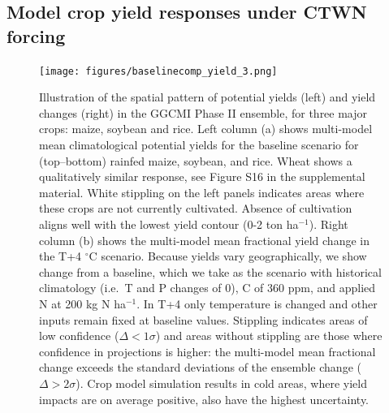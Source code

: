 \documentclass[gmd, manuscript]{copernicus} %
\begin{document}
\subsection{Model crop yield responses under CTWN forcing}
\begin{figure}[ht]
\centering
   \texttt{[image: figures/baselinecomp\_yield\_3.png]} 
  \caption{Illustration of the spatial pattern of potential yields (left) and yield changes (right) in the GGCMI Phase II ensemble, for three major crops: maize, soybean and rice. Left column (a) shows multi-model mean climatological potential yields for the baseline scenario for (top--bottom) rainfed maize, soybean, and rice. 
   Wheat shows a qualitatively similar response, see Figure S16 in the supplemental material. %
   White stippling on the left panels indicates areas where these crops are not currently cultivated. 
   Absence of cultivation aligns well with the lowest yield contour (0-2 ton ha$^{-1}$). 
   Right column (b) shows the multi-model mean fractional yield change in the T+4 $^{\circ}$C scenario.
   Because yields vary geographically, we show change from a baseline, which we take as the scenario with historical climatology (i.e.\ T and P changes of 0), C of 360 ppm, and applied N at 200 kg N ha$^{-1}$. 
   In T+4 only temperature is changed and other inputs remain fixed at baseline values. 
   Stippling indicates areas of low confidence ($\Delta < 1 \sigma$) and areas without stippling are those where confidence in projections is higher: the multi-model mean fractional change exceeds the standard deviations of the ensemble change ($\Delta > 2\sigma$). 
   Crop model simulation results in cold areas, where yield impacts are on average positive, also have the highest uncertainty.}
   \label{fig:maizesoybaseline}
\end{figure}
\end{document}
